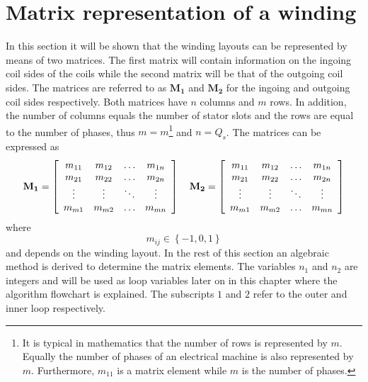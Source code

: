 \chapter{Matrix representation of a winding}
In this section it will be shown that the winding layouts can be represented by means of two matrices. The first matrix will contain information on the ingoing coil sides of the coils while the second matrix will be that of the outgoing coil sides. The matrices are referred to as $\mathbf{M_1}$ and $\mathbf{M_{2}}$ for the ingoing and outgoing coil sides respectively. Both matrices have $n$ columns and $m$ rows. In addition, the number of columns equals the number of stator slots and the rows are equal to the number of phases, thus $m=m$\footnote{It is typical in mathematics that the number of rows is represented by $m$. Equally the number of phases of an electrical machine is also represented by $m$. Furthermore, $m_{11}$ is a matrix element while $m$ is the number of phases.} and $n=Q_s$. The matrices can be expressed as
\begin{equation}
  \label{eqn:M_matrix}
  \mathbf{M_1} = \left[
  \begin{array}{cccc}
     m_{11} & m_{12} & \ldots & m_{1n}\\
     m_{21} & m_{22} & \ldots & m_{2n}\\
     \vdots & \vdots & \ddots & \vdots\\
     m_{m1} & m_{m2} & \ldots & m_{mn}\\
  \end{array} \right]
  \quad
  \mathbf{M_2} = \left[
  \begin{array}{c c c c}
     m_{11} & m_{12} & \ldots & m_{1n}\\
     m_{21} & m_{22} & \ldots & m_{2n}\\
     \vdots & \vdots & \ddots & \vdots\\
     m_{m1} & m_{m2} & \ldots & m_{mn}\\
  \end{array} \right]  
\end{equation}
where
\begin{equation}
  \label{eqn:cij_set}
  m_{ij} \in \left\{-1,0,1\right\}
\end{equation}
and depends on the winding layout. In the rest of this section an algebraic method is derived to determine the matrix elements. The variables $n_1$ and $n_2$ are integers and will be used as loop variables later on in this chapter where the algorithm flowchart is explained. The subscripts $1$ and $2$ refer to the outer and inner loop respectively. 

